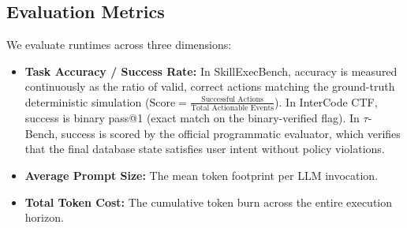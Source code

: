 \documentclass[11pt]{article}
\begin{document}
\subsection{Evaluation Metrics}
\label{subsec:metrics}

We evaluate runtimes across three dimensions:
\begin{itemize}[leftmargin=*]
    \item \textbf{Task Accuracy / Success Rate:} In SkillExecBench, accuracy is measured continuously as the ratio of valid, correct actions matching the ground-truth deterministic simulation ($\text{Score} = \frac{\text{Successful Actions}}{\text{Total Actionable Events}}$). In InterCode CTF, success is binary pass@1 (exact match on the binary-verified flag). In $\tau$-Bench, success is scored by the official programmatic evaluator, which verifies that the final database state satisfies user intent without policy violations.
    \item \textbf{Average Prompt Size:} The mean token footprint per LLM invocation.
    \item \textbf{Total Token Cost:} The cumulative token burn across the entire execution horizon.
\end{itemize}
\end{document}
